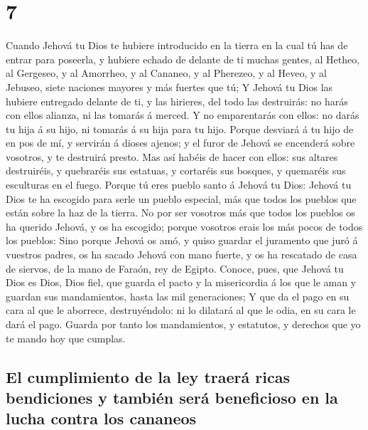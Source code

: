 \hypertarget{section-6}{%
\section{7}\label{section-6}}

 Cuando Jehová tu Dios te hubiere introducido en la tierra
en la cual tú has de entrar para poseerla, y hubiere echado de delante
de ti muchas gentes, al Hetheo, al Gergeseo, y al Amorrheo, y al
Cananeo, y al Pherezeo, y al Heveo, y al Jebuseo, siete naciones mayores
y más fuertes que tú;  Y Jehová tu Dios las hubiere
entregado delante de ti, y las hirieres, del todo las destruirás: no
harás con ellos alianza, ni las tomarás á merced.  Y no
emparentarás con ellos: no darás tu hija á su hijo, ni tomarás á su hija
para tu hijo.  Porque desviará á tu hijo de en pos de mí,
y servirán á dioses ajenos; y el furor de Jehová se encenderá sobre
vosotros, y te destruirá presto.  Mas así habéis de hacer
con ellos: sus altares destruiréis, y quebraréis sus estatuas, y
cortaréis sus bosques, y quemaréis sus esculturas en el fuego.
 Porque tú eres pueblo santo á Jehová tu Dios: Jehová tu
Dios te ha escogido para serle un pueblo especial, más que todos los
pueblos que están sobre la haz de la tierra.  No por ser
vosotros más que todos los pueblos os ha querido Jehová, y os ha
escogido; porque vosotros erais los más pocos de todos los pueblos:
 Sino porque Jehová os amó, y quiso guardar el juramento
que juró á vuestros padres, os ha sacado Jehová con mano fuerte, y os ha
rescatado de casa de siervos, de la mano de Faraón, rey de Egipto.
 Conoce, pues, que Jehová tu Dios es Dios, Dios fiel, que
guarda el pacto y la misericordia á los que le aman y guardan sus
mandamientos, hasta las mil generaciones;  Y que da el
pago en su cara al que le aborrece, destruyéndolo: ni lo dilatará al que
le odia, en su cara le dará el pago.  Guarda por tanto
los mandamientos, y estatutos, y derechos que yo te mando hoy que
cumplas.

\hypertarget{el-cumplimiento-de-la-ley-traeruxe1-ricas-bendiciones-y-tambiuxe9n-seruxe1-beneficioso-en-la-lucha-contra-los-cananeos}{%
\subsection{El cumplimiento de la ley traerá ricas bendiciones y también
será beneficioso en la lucha contra los
cananeos}\label{el-cumplimiento-de-la-ley-traeruxe1-ricas-bendiciones-y-tambiuxe9n-seruxe1-beneficioso-en-la-lucha-contra-los-cananeos}}

